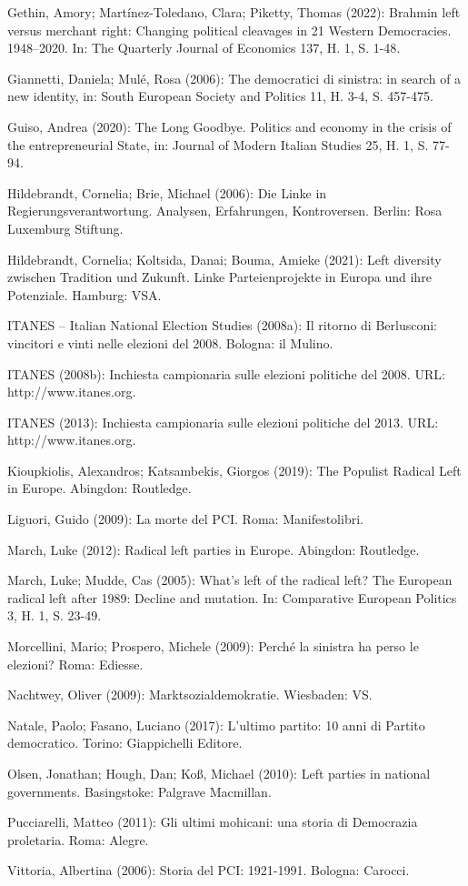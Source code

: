 \begin{multicols*}{2}
\begin{bibdescription}
        \item Gethin, Amory; Martínez-Toledano, Clara; Piketty, Thomas (2022): Brahmin left versus merchant right: Changing political cleavages in 21 Western Democracies. 1948–2020. In: The Quarterly Journal of Economics 137, H. 1, S. 1-48.
        \item Giannetti, Daniela; Mulé, Rosa (2006): The democratici di sinistra: in search of a new identity, in: South European Society and Politics 11, H. 3-4, S. 457-475.
        \item Guiso, Andrea (2020): The Long Goodbye. Politics and economy in the crisis of the entrepreneurial State, in: Journal of Modern Italian Studies 25, H. 1, S. 77-94.
        \item Hildebrandt, Cornelia; Brie, Michael (2006): Die Linke in Regierungsverantwortung. Analysen, Erfahrungen, Kontroversen. Berlin: Rosa Luxemburg Stiftung.
        \item Hildebrandt, Cornelia; Koltsida, Danai; Bouma, Amieke (2021): Left diversity zwischen Tradition und Zukunft. Linke Parteienprojekte in Europa und ihre Potenziale. Hamburg: VSA.
        \item ITANES – Italian National Election Studies (2008a): Il ritorno di Berlusconi: vincitori e vinti nelle elezioni del 2008. Bologna: il Mulino.
        \item ITANES (2008b): Inchiesta campionaria sulle elezioni politiche del 2008. URL: http://www.itanes.org.
        \item ITANES (2013): Inchiesta campionaria sulle elezioni politiche del 2013. URL: http://www.itanes.org.
        \item Kioupkiolis, Alexandros; Katsambekis, Giorgos (2019): The Populist Radical Left in Europe. Abingdon: Routledge.
        \item Liguori, Guido (2009): La morte del PCI. Roma: Manifestolibri.
        \item March, Luke (2012): Radical left parties in Europe. Abingdon: Routledge.
        \item March, Luke; Mudde, Cas (2005): What’s left of the radical left? The European radical left after 1989: Decline and mutation. In: Comparative European Politics 3, H. 1, S. 23-49.
        \item Morcellini, Mario; Prospero, Michele (2009): Perché la sinistra ha perso le elezioni? Roma: Ediesse.
        \item Nachtwey, Oliver (2009): Marktsozialdemokratie. Wiesbaden: VS.
        \item Natale, Paolo; Fasano, Luciano (2017): L’ultimo partito: 10 anni di Partito democratico. Torino: Giappichelli Editore.
        \item Olsen, Jonathan; Hough, Dan; Koß, Michael (2010): Left parties in national governments. Basingstoke: Palgrave Macmillan.
        \item Pucciarelli, Matteo (2011): Gli ultimi mohicani: una storia di Democrazia proletaria. Roma: Alegre.
        \item Vittoria, Albertina (2006): Storia del PCI: 1921-1991. Bologna: Carocci.
        

\end{bibdescription}
\end{multicols*}
